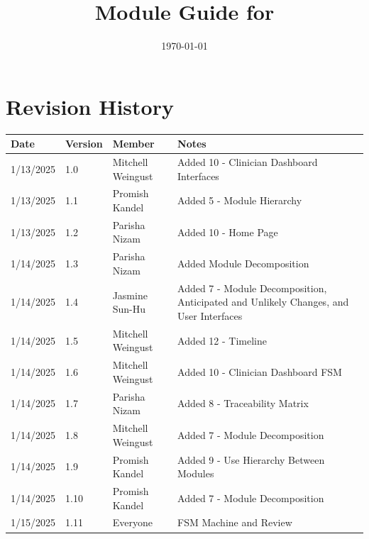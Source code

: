 \documentclass[12pt, titlepage]{article}
\begin{document}
\title{Module Guide for \progname{}} 
\author{\authname}
\date{\today}

\maketitle


\section{Revision History}

\begin{tabularx}{\textwidth}{p{3cm}p{2cm}p{3cm}X}
  \toprule {\bf Date} & {\bf Version} & {\bf Member} & {\bf Notes}\\
  \midrule
  1/13/2025 & 1.0 & Mitchell Weingust & Added 10 - Clinician Dashboard Interfaces\\
  1/13/2025 & 1.1 & Promish Kandel & Added 5 - Module Hierarchy\\
  1/13/2025 & 1.2 & Parisha Nizam & Added 10 - Home Page \\
  1/14/2025 & 1.3 & Parisha Nizam & Added Module Decomposition\\
  1/14/2025 & 1.4 & Jasmine Sun-Hu & Added 7 - Module Decomposition, Anticipated and Unlikely Changes, and User Interfaces\\
  1/14/2025 & 1.5 & Mitchell Weingust & Added 12 - Timeline\\
  1/14/2025 & 1.6 & Mitchell Weingust & Added 10 - Clinician Dashboard FSM\\
  1/14/2025 & 1.7 & Parisha Nizam & Added 8 - Traceability Matrix\\
  1/14/2025 & 1.8 & Mitchell Weingust & Added 7 - Module Decomposition\\
  1/14/2025 & 1.9 & Promish Kandel & Added 9 - Use Hierarchy Between Modules\\
  1/14/2025 & 1.10 & Promish Kandel & Added 7 - Module Decomposition\\
  1/15/2025 & 1.11 & Everyone & FSM Machine and Review \\
  \bottomrule
\end{tabularx}
\end{document}
